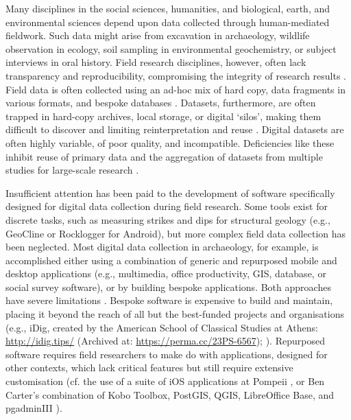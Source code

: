 \documentclass[preprint,12pt, a4paper]{elsarticle}
\begin{document}
Many disciplines in the social sciences, humanities, and biological, earth, and environmental sciences depend upon data collected through human-mediated fieldwork. Such data might arise from excavation in archaeology, wildlife observation in ecology, soil sampling in environmental geochemistry, or subject interviews in oral history. Field research disciplines, however, often lack transparency and reproducibility, compromising the integrity of research results \cite{McNutt2016-dg}. Field data is often collected using an ad-hoc mix of hard copy, data fragments in various formats, and bespoke databases \cite{Borgman2015-zg, Kansa2010-qx, Kintigh2006-uf, Snow2006-nu}. Datasets, furthermore, are often trapped in hard-copy archives, local storage, or digital `silos', making them difficult to discover and limiting reinterpretation and reuse \cite{Blanke2010-ou}. Digital datasets are often highly variable, of poor quality, and incompatible. Deficiencies like these inhibit reuse of primary data and the aggregation of datasets from multiple studies for large-scale research \cite{Kintigh2006-uf, Kintigh2014-ks, McNutt2016-dg}. 

Insufficient attention has been paid to the development of software specifically designed for digital data collection during field research. Some tools exist for discrete tasks, such as measuring strikes and dips for structural geology (e.g., GeoCline or Rocklogger for Android), but more complex field data collection has been neglected. Most digital data collection in archaeology, for example, is accomplished either using a combination of generic and repurposed mobile and desktop applications (e.g., multimedia, office productivity, GIS, database, or social survey software), or by building bespoke applications. Both approaches have severe limitations \cite{Sobotkova2016-mx}. Bespoke software is expensive to build and maintain, placing it beyond the reach of all but the best-funded projects and organisations (e.g., iDig, created by the American School of Classical Studies at Athens: \url{http://idig.tips/} (Archived at: \url{https://perma.cc/23PS-6567}); \cite{Fee2016-nn}). Repurposed software requires field researchers to make do with applications, designed for other contexts, which lack critical features but still require extensive customisation (cf. the use of a suite of iOS applications at Pompeii \cite{Ellis2016-vh}, or Ben Carter's combination of Kobo Toolbox, PostGIS, QGIS, LibreOffice Base, and pgadminIII \cite{Carter2016-jm}). 
\end{document}

